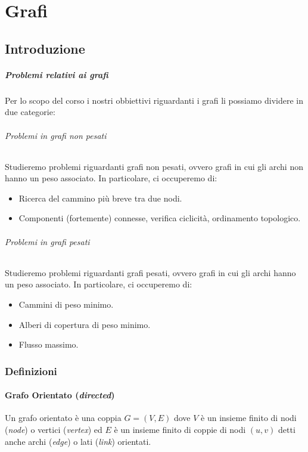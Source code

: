 \chapter{Grafi}
\thispagestyle{chapterInit}
\label{ch:grafi}
\section{Introduzione}
    \paragraph{Problemi relativi ai grafi} Per lo scopo del corso i nostri obbiettivi riguardanti i grafi li possiamo dividere in due categorie:
        \subparagraph{Problemi in grafi non pesati} Studieremo problemi riguardanti grafi non pesati, ovvero grafi in cui gli archi non hanno un peso associato. In particolare, ci occuperemo di: \begin{itemize}
            \item Ricerca del cammino più breve tra due nodi.
            \item Componenti (fortemente) connesse, verifica ciclicità, ordinamento topologico.
        \end{itemize}
        \subparagraph{Problemi in grafi pesati} Studieremo problemi riguardanti grafi pesati, ovvero grafi in cui gli archi hanno un peso associato. In particolare, ci occuperemo di: \begin{itemize}
            \item Cammini di peso minimo.
            \item Alberi di copertura di peso minimo.
            \item Flusso massimo.
        \end{itemize}
    \subsection{Definizioni}
        \subsubsection{Grafo Orientato (\textit{directed})}
            \begin{definition}
                Un grafo orientato è una coppia $G = (V, E)$ dove $V$ è un insieme finito di nodi (\textit{node}) o vertici (\textit{vertex}) ed $E$ è un insieme finito di coppie di nodi $(u,v)$ detti anche archi (\textit{edge}) o lati (\textit{link}) orientati.
            \end{definition}
